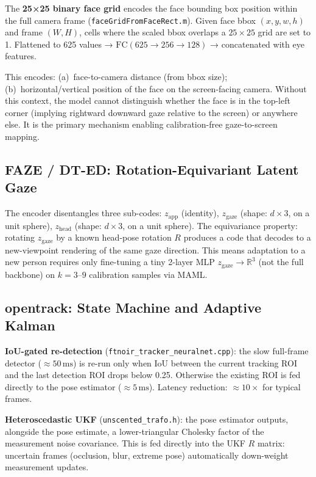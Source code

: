\documentclass[11pt,a4paper]{article}
\begin{document}
The \textbf{25×25 binary face grid} encodes the face bounding box position within the full
camera frame (\texttt{faceGridFromFaceRect.m}).
Given face bbox $(x, y, w, h)$ and frame $(W, H)$,
cells where the scaled bbox overlaps a $25\times25$ grid are set to 1.
Flattened to 625 values → $\text{FC}(625 \to 256 \to 128)$ → concatenated with eye features.

This encodes: (a)~face-to-camera distance (from bbox size);
(b)~horizontal/vertical position of the face on the screen-facing camera.
Without this context, the model cannot distinguish whether the face is in the top-left
corner (implying rightward downward gaze relative to the screen) or anywhere else.
It is the primary mechanism enabling calibration-free gaze-to-screen mapping.

\subsection{FAZE / DT-ED: Rotation-Equivariant Latent Gaze}

The encoder disentangles three sub-codes:
$z_\text{app}$ (identity), $z_\text{gaze}$ (shape: $d \times 3$, on a unit sphere),
$z_\text{head}$ (shape: $d \times 3$, on a unit sphere).
The equivariance property: rotating $z_\text{gaze}$ by a known head-pose rotation $R$
produces a code that decodes to a new-viewpoint rendering of the same gaze direction.
This means adaptation to a new person requires only fine-tuning a tiny 2-layer MLP
$z_\text{gaze} \to \mathbb{R}^3$ (not the full backbone) on $k=3$--$9$ calibration samples via MAML.

\subsection{opentrack: State Machine and Adaptive Kalman}

\textbf{IoU-gated re-detection} (\texttt{ftnoir\_tracker\_neuralnet.cpp}):
the slow full-frame detector ($\approx50\,\text{ms}$) is re-run only when
IoU between the current tracking ROI and the last detection ROI drops below 0.25.
Otherwise the existing ROI is fed directly to the pose estimator ($\approx5\,\text{ms}$).
Latency reduction: $\approx10\times$ for typical frames.

\textbf{Heteroscedastic UKF} (\texttt{unscented\_trafo.h}):
the pose estimator outputs, alongside the pose estimate, a lower-triangular Cholesky factor
of the measurement noise covariance.
This is fed directly into the UKF $R$ matrix:
uncertain frames (occlusion, blur, extreme pose) automatically down-weight measurement updates.
\end{document}

